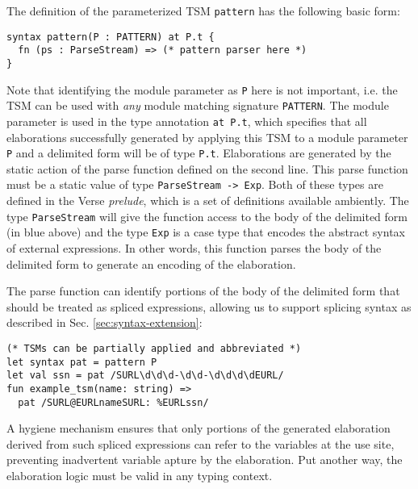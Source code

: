 The definition of the parameterized TSM \lstinline{pattern} has the following basic form:
\begin{lstlisting}[numbers=none]
syntax pattern(P : PATTERN) at P.t {
  fn (ps : ParseStream) => (* pattern parser here *)
}
\end{lstlisting}
Note that identifying the module parameter as \lstinline{P} here is not important, i.e. the TSM can be used with \emph{any} module matching signature \lstinline{PATTERN}. The module parameter is used in the type annotation \lstinline{at P.t}, which specifies that all elaborations successfully generated by applying this TSM to a module parameter \lstinline{P} and a delimited form will be of type \lstinline{P.t}. Elaborations are generated by the static action of the parse function defined on the second line. This parse function must be  a static value of type \lstinline{ParseStream -> Exp}.  Both of these types are defined in the Verse \emph{prelude}, which is a set of definitions available ambiently. The type \lstinline{ParseStream} will give the function access to the {body} of the delimited form (in blue above) and the type \lstinline{Exp} is a case type that encodes the abstract syntax of external expressions. In other words, this function parses the body of the delimited form to generate an encoding of the elaboration.

The parse function can identify portions of the body of the delimited form that should be treated as spliced expressions, allowing us to support splicing syntax as described in Sec. \ref{sec:syntax-extension}:
\begin{lstlisting}[numbers=none]
(* TSMs can be partially applied and abbreviated *)
let syntax pat = pattern P
let val ssn = pat /SURL\d\d\d-\d\d-\d\d\d\dEURL/
fun example_tsm(name: string) => 
  pat /SURL@EURLnameSURL: %EURLssn/
\end{lstlisting}

A hygiene mechanism ensures that only portions of the generated elaboration derived from such spliced expressions can refer to the variables at the use site, preventing inadvertent variable apture by the elaboration. Put another way, the  elaboration logic must be valid in any typing context.

